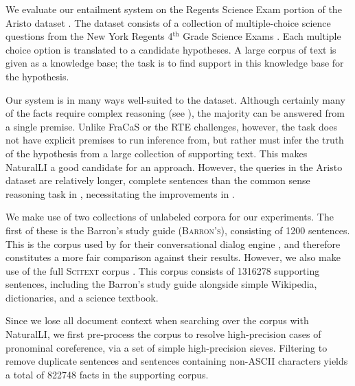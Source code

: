 %
%
We evaluate our entailment system on the Regents Science Exam portion of
  the Aristo dataset \cite{key:2013clark-aristo,key:2015clark-aristo}.
The dataset consists of a collection of multiple-choice science questions
  from the New York Regents 4$^{\textrm{th}}$ Grade Science Exams
  \cite{key:NYSED}.
Each multiple choice option is translated to a candidate hypotheses.
A large corpus of text is given as a knowledge base;
  the task is to find support in this knowledge base for the hypothesis.

Our system is in many ways well-suited to the dataset.
Although certainly many of the facts require complex reasoning
  (see ), the majority can be
  answered from a single premise.
Unlike FraCaS or the RTE challenges, however, the task does not have explicit
  premises to run inference from, but rather must infer the truth of the
  hypothesis from a large collection of supporting text.
This makes NaturalLI a good candidate for an approach.
However, the queries in the Aristo dataset are relatively longer, complete
  sentences than the common sense reasoning task in
  , necessitating the 
  improvements in .

We make use of two collections of unlabeled corpora for our experiments.
The first of these is the Barron's study guide (\textsc{Barron's}), 
  consisting of \num{1200} sentences.
This is the corpus used by  for their conversational
  dialog engine \knowbot, and therefore constitutes a more fair comparison against 
  their results.
However, we also make use of the full \textsc{Scitext} corpus \cite{key:2014clark-aristo}.
This corpus consists of \num{1316278} supporting sentences, 
  including the Barron's study guide alongside 
  simple Wikipedia, dictionaries, and a science textbook.

Since we lose all document context when searching over the corpus with NaturalLI,
  we first pre-process the corpus to resolve high-precision cases of
  pronominal coreference, via a set of simple high-precision sieves.
Filtering to remove duplicate sentences and sentences containing
    non-ASCII characters yields a total of \num{822748} facts in the supporting corpus.

